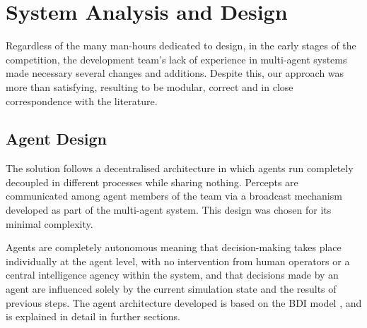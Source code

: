 \documentclass{llncs2e/llncs}
\begin{document}
\section{System Analysis and Design}

    Regardless of the many man-hours dedicated to design, in the early stages of
    the competition, the development team's lack of experience in multi-agent
    systems made necessary several changes and additions. 
    Despite this, our approach was more than satisfying, resulting to be
    modular, correct and in close correspondence with the literature.

\subsection{Agent Design}

    The solution follows a decentralised architecture in which agents run 
    completely decoupled in different processes while sharing nothing. Percepts 
    are communicated among agent members of the team via a broadcast mechanism 
    developed as part of the multi-agent system. This design was chosen for its 
    minimal complexity.

    Agents are completely autonomous meaning that decision-making takes place 
    individually at the agent level, with no intervention from human operators or 
    a central intelligence agency within the system, and that decisions made by an 
    agent are influenced solely by the current simulation state and the results of 
    previous steps.
    The agent architecture developed is based on the BDI model \cite{Rao:1991}, 
    and is explained in detail in further sections.
\end{document}
